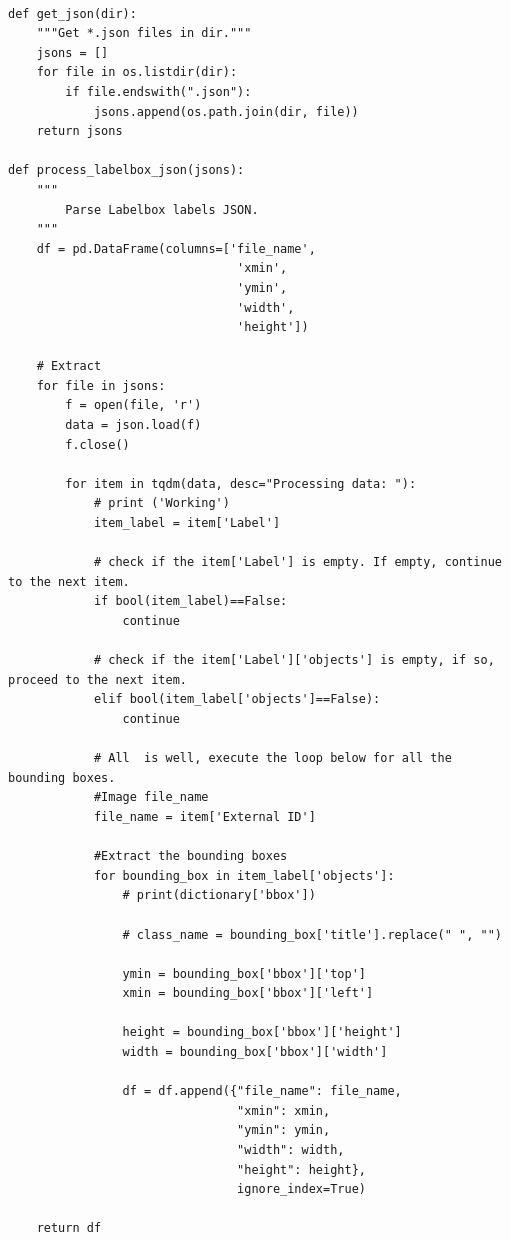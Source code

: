 \documentclass[12pt]{report}
\begin{document}
\begin{lstlisting}

def get_json(dir):
    """Get *.json files in dir."""
    jsons = []
    for file in os.listdir(dir):
        if file.endswith(".json"):
            jsons.append(os.path.join(dir, file))
    return jsons

def process_labelbox_json(jsons):
    """
        Parse Labelbox labels JSON.
    """
    df = pd.DataFrame(columns=['file_name',
                                'xmin',
                                'ymin',
                                'width',
                                'height'])
    
    # Extract
    for file in jsons:
        f = open(file, 'r')
        data = json.load(f)
        f.close()
        
        for item in tqdm(data, desc="Processing data: "):
            # print ('Working')
            item_label = item['Label']

            # check if the item['Label'] is empty. If empty, continue to the next item.
            if bool(item_label)==False:
                continue

            # check if the item['Label']['objects'] is empty, if so, proceed to the next item.
            elif bool(item_label['objects']==False):
                continue

            # All  is well, execute the loop below for all the bounding boxes.
            #Image file_name
            file_name = item['External ID']

            #Extract the bounding boxes
            for bounding_box in item_label['objects']:
                # print(dictionary['bbox'])

                # class_name = bounding_box['title'].replace(" ", "")

                ymin = bounding_box['bbox']['top']
                xmin = bounding_box['bbox']['left']

                height = bounding_box['bbox']['height']
                width = bounding_box['bbox']['width']

                df = df.append({"file_name": file_name,
                                "xmin": xmin,
                                "ymin": ymin,
                                "width": width,
                                "height": height},
                                ignore_index=True)
            
    return df
    


\end{lstlisting}
\end{document}
